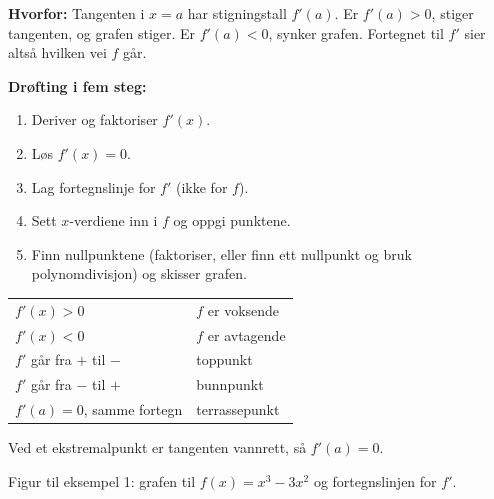 \begin{mustkunne}
\begin{minipage}[t]{0.50\linewidth}
\textbf{Hvorfor:} Tangenten i $x = a$ har stigningstall $f'(a)$. Er $f'(a) > 0$, stiger tangenten, og grafen stiger. Er $f'(a) < 0$, synker grafen. Fortegnet til $f'$ sier altså hvilken vei $f$ går.\par\smallskip
\textbf{Drøfting i fem steg:}
\begin{enumerate}[leftmargin=1.4em,itemsep=0pt,topsep=2pt]
  \item Deriver og faktoriser $f'(x)$.
  \item Løs $f'(x) = 0$.
  \item Lag fortegnslinje for $f'$ (ikke for $f$).
  \item Sett $x$-verdiene inn i $f$ og oppgi punktene.
  \item Finn nullpunktene (faktoriser, eller finn ett nullpunkt og bruk polynomdivisjon) og skisser grafen.
\end{enumerate}
\end{minipage}\hfill
\begin{minipage}[t]{0.47\linewidth}
\renewcommand{\arraystretch}{1.5}
\begin{tabular}[t]{@{}l l@{}}
$f'(x) > 0$ & $f$ er voksende\\
$f'(x) < 0$ & $f$ er avtagende\\
$f'$ går fra $+$ til $-$ & toppunkt\\
$f'$ går fra $-$ til $+$ & bunnpunkt\\
$f'(a) = 0$, samme fortegn & terrassepunkt\\
\end{tabular}\par\smallskip
Ved et ekstremalpunkt er tangenten vannrett, så $f'(a) = 0$.\par\smallskip
{\footnotesize Figur til eksempel 1: grafen til $f(x) = x^3 - 3x^2$ og fortegnslinjen for $f'$.}\par
\centering
{}
\end{minipage}
\end{mustkunne}
